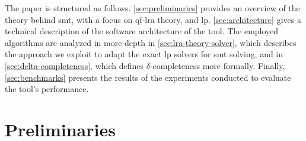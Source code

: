 \documentclass[runningheads]{llncs}
\begin{document}
The paper is structured as follows.
\autoref{sec:preliminaries} provides an overview of the theory behind \gls{smt}, with a focus on \gls{qf-lra} theory, and \gls{lp}.
\autoref{sec:architecture} gives a technical description of the software architecture of the tool.
The employed algorithms are analyzed in more depth in \autoref{sec:lra-theory-solver}, which describes the approach we exploit to adapt the exact \gls{lp} solvers for \gls{smt} solving, and in \autoref{sec:delta-completeness}, which defines $\delta$-completeness more formally.
Finally, \autoref{sec:benchmarks} presents the results of the experiments conducted to evaluate the tool's performance.

\section{Preliminaries}
\label{sec:preliminaries}
\end{document}
